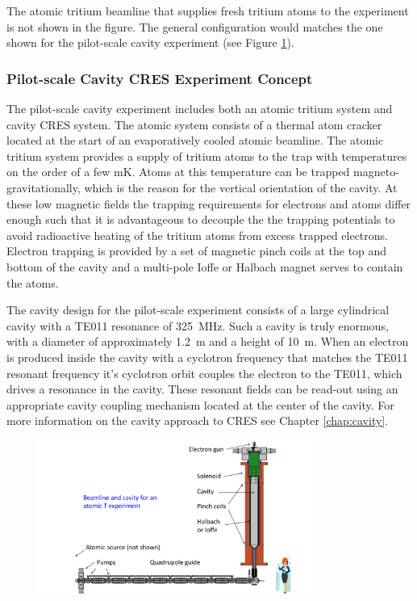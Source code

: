 The atomic tritium beamline that supplies fresh tritium atoms to the experiment is not shown in the figure. The general configuration would matches the one shown for the pilot-scale cavity experiment (see Figure \ref{fig:chap3-cavity-pilot-scale}).

\subsubsection*{Pilot-scale Cavity CRES Experiment Concept}

The pilot-scale cavity experiment includes both an atomic tritium system and cavity CRES system. The atomic system consists of a thermal atom cracker located at the start of an evaporatively cooled atomic beamline. The atomic tritium system provides a supply of tritium atoms to the trap with temperatures on the order of a few mK. Atoms at this temperature can be trapped magneto-gravitationally, which is the reason for the vertical orientation of the cavity. At these low magnetic fields the trapping requirements for electrons and atoms differ enough such that it is advantageous to decouple the the trapping potentials to avoid radioactive heating of the tritium atoms from excess trapped electrons. Electron trapping is provided by a set of magnetic pinch coils at the top and bottom of the cavity and a multi-pole Ioffe or Halbach magnet serves to contain the atoms.

The cavity design for the pilot-scale experiment consists of a large cylindrical cavity with a TE011 resonance of 325~MHz. Such a cavity is truly enormous, with a diameter of approximately 1.2~m and a height of 10~m. When an electron is produced inside the cavity with a cyclotron frequency that matches the TE011 resonant frequency it's cyclotron orbit couples the electron to the TE011, which drives a resonance in the cavity. These resonant fields can be read-out using an appropriate cavity coupling mechanism located at the center of the cavity. For more information on the cavity approach to CRES see Chapter \ref{chap:cavity}.

\begin{figure}[htbp]
    \centering
    \includegraphics*[width=0.8\textwidth]{figs/Chapter-3/CavityAndBeamAndPerson2.pdf}
    \caption{\label{fig:chap3-cavity-pilot-scale}}
\end{figure}

